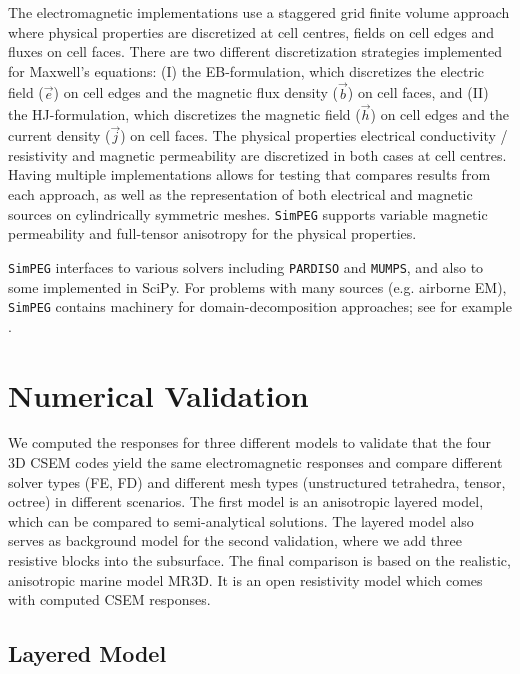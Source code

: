 \documentclass[
    paper,
  ]{geophysics}
\newcommand{\simpeg}{\texttt{SimPEG}\xspace}
\begin{document}
The electromagnetic implementations use a staggered grid finite volume approach where physical properties are discretized at cell centres, fields on cell edges and fluxes on cell faces.
There are two different discretization strategies implemented for Maxwell's equations: (I) the EB-formulation, which discretizes the electric field ($\vec{e}$) on cell edges and the magnetic flux density ($\vec{b}$) on cell faces, and (II) the HJ-formulation, which discretizes the magnetic field ($\vec{h}$) on cell edges and the current density ($\vec{j}$) on cell faces. The physical properties electrical conductivity / resistivity and magnetic permeability are discretized in both cases at cell centres. Having multiple implementations allows for testing that compares results from each approach, as well as the representation of both electrical and magnetic sources on cylindrically symmetric meshes. \simpeg supports variable magnetic permeability and full-tensor anisotropy for the physical properties.

\simpeg interfaces to various solvers including \texttt{PARDISO} and \texttt{MUMPS}, and also to some implemented in SciPy. For problems with many sources (e.g. airborne EM), \simpeg contains machinery for domain-decomposition approaches; see for example \cite{GEO.20.Fournier}.

\section{Numerical Validation}

We computed the responses for three different models to validate that the four 3D CSEM codes yield the same electromagnetic responses and compare different solver types (FE, FD) and different mesh types (unstructured tetrahedra, tensor, octree) in different scenarios. The first model is an anisotropic layered model, which can be compared to semi-analytical solutions. The layered model also serves as background model for the second validation, where we add three resistive blocks into the subsurface. The final comparison is based on the realistic, anisotropic marine model MR3D. It is an open resistivity model which comes with computed CSEM responses.

\subsection{Layered Model}
\end{document}
